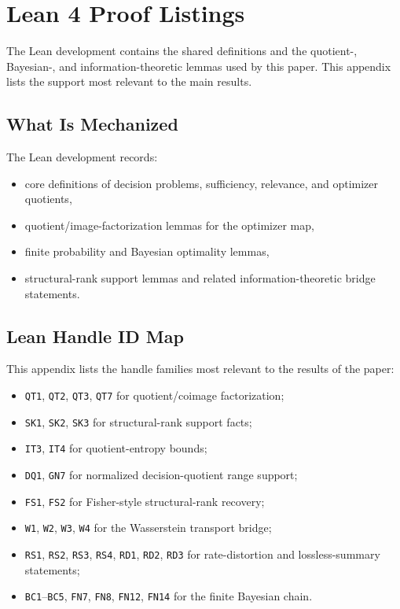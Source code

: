 \section{Lean 4 Proof Listings}\label{app:lean}

The Lean development contains the shared definitions and the quotient-, Bayesian-, and information-theoretic lemmas used by this paper. This appendix lists the support most relevant to the main results.

\subsection{What Is Mechanized}

The Lean development records:
\begin{itemize}
\item core definitions of decision problems, sufficiency, relevance, and optimizer quotients,
\item quotient/image-factorization lemmas for the optimizer map,
\item finite probability and Bayesian optimality lemmas,
\item structural-rank support lemmas and related information-theoretic bridge statements.
\end{itemize}

\subsection{Lean Handle ID Map}\label{sec:lean-handle-id-map}
This appendix lists the handle families most relevant to the results of the paper:
\begin{itemize}
\item \texttt{QT1}, \texttt{QT2}, \texttt{QT3}, \texttt{QT7} for quotient/coimage factorization;
\item \texttt{SK1}, \texttt{SK2}, \texttt{SK3} for structural-rank support facts;
\item \texttt{IT3}, \texttt{IT4} for quotient-entropy bounds;
\item \texttt{DQ1}, \texttt{GN7} for normalized decision-quotient range support;
\item \texttt{FS1}, \texttt{FS2} for Fisher-style structural-rank recovery;
\item \texttt{W1}, \texttt{W2}, \texttt{W3}, \texttt{W4} for the Wasserstein transport bridge;
\item \texttt{RS1}, \texttt{RS2}, \texttt{RS3}, \texttt{RS4}, \texttt{RD1}, \texttt{RD2}, \texttt{RD3} for rate-distortion and lossless-summary statements;
\item \texttt{BC1}--\texttt{BC5}, \texttt{FN7}, \texttt{FN8}, \texttt{FN12}, \texttt{FN14} for the finite Bayesian chain.
\end{itemize}

